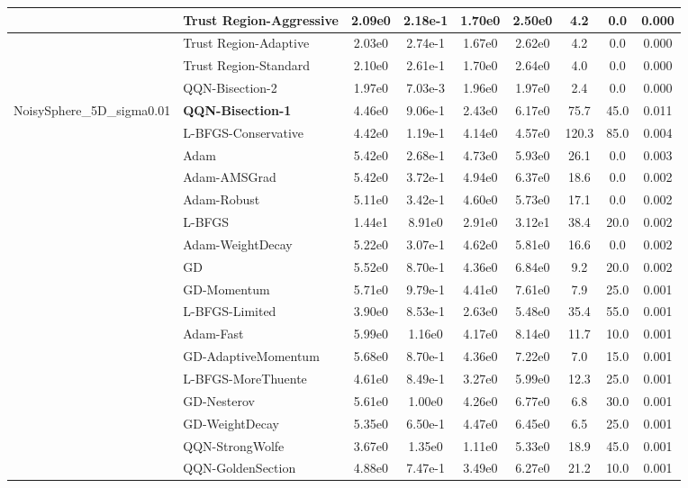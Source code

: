 \documentclass[10pt]{article}
\begin{document}
\begin{longtable}{|l|l|c|c|c|c|c|c|c|}
\hline
 & Trust Region-Aggressive & 2.09e0 & 2.18e-1 & 1.70e0 & 2.50e0 & 4.2 & 0.0 & 0.000 \\
\hline
 & Trust Region-Adaptive & 2.03e0 & 2.74e-1 & 1.67e0 & 2.62e0 & 4.2 & 0.0 & 0.000 \\
\hline
 & Trust Region-Standard & 2.10e0 & 2.61e-1 & 1.70e0 & 2.64e0 & 4.0 & 0.0 & 0.000 \\
\hline
 & QQN-Bisection-2 & 1.97e0 & 7.03e-3 & 1.96e0 & 1.97e0 & 2.4 & 0.0 & 0.000 \\
NoisySphere\_5D\_sigma0.01 & \textbf{QQN-Bisection-1} & 4.46e0 & 9.06e-1 & 2.43e0 & 6.17e0 & 75.7 & 45.0 & 0.011 \\
\hline
 & L-BFGS-Conservative & 4.42e0 & 1.19e-1 & 4.14e0 & 4.57e0 & 120.3 & 85.0 & 0.004 \\
\hline
 & Adam & 5.42e0 & 2.68e-1 & 4.73e0 & 5.93e0 & 26.1 & 0.0 & 0.003 \\
\hline
 & Adam-AMSGrad & 5.42e0 & 3.72e-1 & 4.94e0 & 6.37e0 & 18.6 & 0.0 & 0.002 \\
\hline
 & Adam-Robust & 5.11e0 & 3.42e-1 & 4.60e0 & 5.73e0 & 17.1 & 0.0 & 0.002 \\
\hline
 & L-BFGS & 1.44e1 & 8.91e0 & 2.91e0 & 3.12e1 & 38.4 & 20.0 & 0.002 \\
\hline
 & Adam-WeightDecay & 5.22e0 & 3.07e-1 & 4.62e0 & 5.81e0 & 16.6 & 0.0 & 0.002 \\
\hline
 & GD & 5.52e0 & 8.70e-1 & 4.36e0 & 6.84e0 & 9.2 & 20.0 & 0.002 \\
\hline
 & GD-Momentum & 5.71e0 & 9.79e-1 & 4.41e0 & 7.61e0 & 7.9 & 25.0 & 0.001 \\
\hline
 & L-BFGS-Limited & 3.90e0 & 8.53e-1 & 2.63e0 & 5.48e0 & 35.4 & 55.0 & 0.001 \\
\hline
 & Adam-Fast & 5.99e0 & 1.16e0 & 4.17e0 & 8.14e0 & 11.7 & 10.0 & 0.001 \\
\hline
 & GD-AdaptiveMomentum & 5.68e0 & 8.70e-1 & 4.36e0 & 7.22e0 & 7.0 & 15.0 & 0.001 \\
\hline
 & L-BFGS-MoreThuente & 4.61e0 & 8.49e-1 & 3.27e0 & 5.99e0 & 12.3 & 25.0 & 0.001 \\
\hline
 & GD-Nesterov & 5.61e0 & 1.00e0 & 4.26e0 & 6.77e0 & 6.8 & 30.0 & 0.001 \\
\hline
 & GD-WeightDecay & 5.35e0 & 6.50e-1 & 4.47e0 & 6.45e0 & 6.5 & 25.0 & 0.001 \\
\hline
 & QQN-StrongWolfe & 3.67e0 & 1.35e0 & 1.11e0 & 5.33e0 & 18.9 & 45.0 & 0.001 \\
\hline
 & QQN-GoldenSection & 4.88e0 & 7.47e-1 & 3.49e0 & 6.27e0 & 21.2 & 10.0 & 0.001 \\

\end{longtable}
\end{document}

